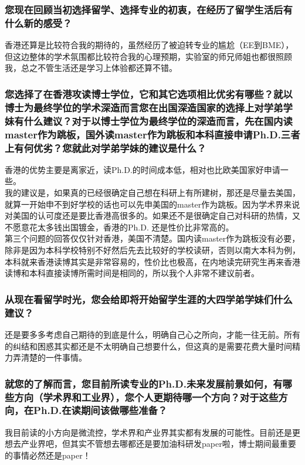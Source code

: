 \documentclass[a4paper,UTF8]{book}
\begin{document}
    \subsubsection*{您现在回顾当初选择留学、选择专业的初衷，在经历了留学生活后有什么新的感受？}
    香港还算是比较符合我的期待的，虽然经历了被迫转专业的尴尬（EE到BME），但这边整体的学术氛围都比较符合我的心理预期，实验室的师兄师姐也都很照顾我，总之不管生活还是学习上体验都还算不错。

    \subsubsection*{您选择了在香港攻读博士学位，它和其它选项相比优劣有哪些？就以博士为最终学位的学术深造而言您在出国深造国家的选择上对学弟学妹有什么建议？对于以博士学位为最终学位的深造而言，先在国内读master作为跳板，国外读master作为跳板和本科直接申请Ph.D.三者上有何优劣？您就此对学弟学妹的建议是什么？}
    香港的优势主要是离家近，读Ph.D.的时间成本低，相对也比欧美国家好申请一些。\\
    我的建议是，如果真的已经很确定自己想在科研上有所建树，那还是尽量去美国，就算一开始申不到好学校的话也可以先申美国的master作为跳板。因为学术界来说对美国的认可度还是要比香港高很多的。如果还不是很确定自己对科研的热情，又不愿意花太多钱出国镀金，香港的Ph.D. 还是性价比非常高的。\\
    第三个问题的回答仅仅针对香港，美国不清楚。国内读master作为跳板没有必要，除非是因为本科学校特别不好然后先去比较好的学校读研，否则以南大本科为例，本科就来香港读博其实是非常容易的，性价比也极高，在内地读完研究生再来香港读博和本科直接读博所需时间是相同的，所以我个人非常不建议前者。

    \subsubsection*{从现在看留学时光，您会给即将开始留学生涯的大四学弟学妹们什么建议？}
    还是要多多考虑自己期待的到底是什么，明确自己心之所向，才能一往无前。所有的纠结和困惑其实都还是不太明确自己想要什么，但这真的是需要花费大量时间精力弄清楚的一件事情。

    \subsubsection*{就您的了解而言，您目前所读专业的Ph.D.未来发展前景如何，有哪些方向（学术界和工业界），您个人更期待哪一个方向？对于这些方向，在Ph.D.在读期间该做哪些准备？}
    我目前读的小方向是微流控，学术界和产业界其实都有发展的可能性。目前还是更想去产业界吧，但其实不管想去哪都还是要加油科研发paper啦，博士期间最重要的事情必然还是paper！
\end{document}

